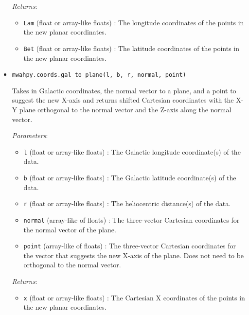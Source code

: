 \documentclass{article}
\begin{document}
\begin{itemize}
\begin{itemize}
\end{itemize}

\textit{Returns}: \begin{itemize}

\item \verb!Lam! (float or array-like floats) : The longitude coordinates of the points in the new planar coordinates.

\item \verb!Bet! (float or array-like floats) : The latitude coordinates of the points in the new planar coordinates.

\end{itemize}



\item \verb!mwahpy.coords.gal_to_plane(l, b, r, normal, point)!

Takes in Galactic coordinates, the normal vector to a plane, and a point to suggest the new X-axis and returns shifted Cartesian coordinates with the X-Y plane orthogonal to the normal vector and the Z-axis along the normal vector. 

\textit{Parameters}: \begin{itemize}

\item \verb!l! (float or array-like floats) : The Galactic longitude coordinate(s) of the data.

\item \verb!b! (float or array-like floats) : The Galactic latitude coordinate(s) of the data.

\item \verb!r! (float or array-like floats) : The heliocentric distance(s) of the data.

\item \verb!normal! (array-like of floats) : The three-vector Cartesian coordinates for the normal vector of the plane.

\item \verb!point! (array-like of floats) : The three-vector Cartesian coordinates for the vector that suggests the new X-axis of the plane. Does not need to be orthogonal to the normal vector.

\end{itemize}

\textit{Returns}: \begin{itemize}

\item \verb!x! (float or array-like floats) : The Cartesian X coordinates of the points in the new planar coordinates.


\end{itemize}
\end{itemize}
\end{document}
